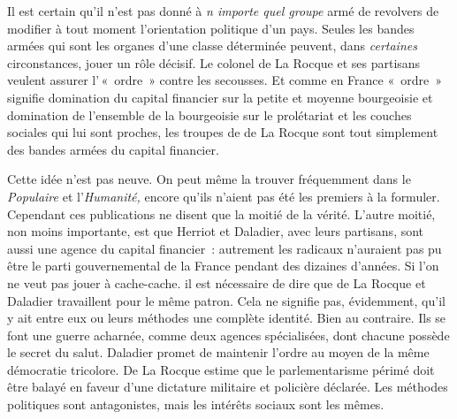 \documentclass[french,twoside]{book} %
\begin{document}
Il est certain qu’il n’est pas donné à \emph{n importe quel groupe} armé de revolvers de modifier à tout moment l’orientation politique d’un pays. Seules les bandes armées qui sont les organes d’une classe déterminée peuvent, dans \emph{certaines} circonstances, jouer un rôle décisif. Le colonel de La Rocque et ses partisans veulent assurer l’ « ordre » contre les secousses. Et comme en France « ordre » signifie domination du capital financier sur la petite et moyenne bourgeoisie et domination de l’ensemble de la bourgeoisie sur le prolétariat et les couches sociales qui lui sont proches, les troupes de de La Rocque sont tout simplement des bandes armées du capital financier.\par
Cette idée n’est pas neuve. On peut même la trouver fréquemment dans le \emph{Populaire} et l’\emph{Humanité,} encore qu’ils n’aient pas été les premiers à la formuler. Cependant ces publications ne disent que la moitié de la vérité. L’autre moitié, non moins importante, est que Herriot et Daladier, avec leurs partisans, sont aussi une agence du capital financier : autrement les radicaux n’auraient pas  pu être le parti gouvernemental de la France pendant des dizaines d’années. Si l’on ne veut pas jouer à cache-cache. il est nécessaire de dire que de La Rocque et Daladier travaillent pour le même patron. Cela ne signifie pas, évidemment, qu’il y ait entre eux ou leurs méthodes une complète identité. Bien au contraire. Ils se font une guerre acharnée, comme deux agences spécialisées, dont chacune possède le secret du salut. Daladier promet de maintenir l’ordre au moyen de la même démocratie tricolore. De La Rocque estime que le parlementarisme périmé doit être balayé en faveur d’une dictature militaire et policière déclarée. Les méthodes politiques sont antagonistes, mais les intérêts sociaux sont les mêmes.\par
\end{document}
